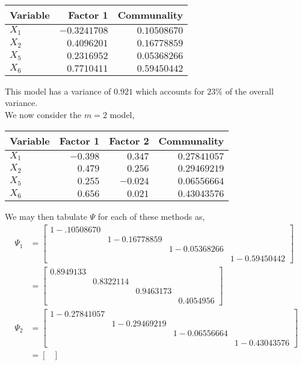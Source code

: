 \documentclass[letterpaper,10pt]{article}
\begin{document}
\begin{description}
\begin{center}
\begin{tabular}{|l|r|r|}
\hline
Variable & Factor 1 & Communality\\\hline
$X_1$ & $ -0.3241708 $ & $ 0.10508670 $\\
$X_2$ & $ 0.4096201 $ & $ 0.16778859 $\\
$X_5$ & $ 0.2316952 $ & $ 0.05368266 $\\
$X_6$ & $ 0.7710411 $ & $ 0.59450442 $\\\hline
\end{tabular}
\end{center}
This model has a variance of $0.921$ which accounts for $23\%$ of the overall variance.\\
We now consider the $m=2$ model,
\begin{center}
\begin{tabular}{|l|r|r|r|}
\hline
Variable & Factor 1 & Factor 2 & Communality\\\hline
$X_1$ & $ -0.398 $ & $ 0.347 $ & $ 0.27841057 $\\
$X_2$ & $ 0.479 $ & $ 0.256 $ & $ 0.29469219 $\\
$X_5$ & $ 0.255 $ & $ -0.024 $ & $ 0.06556664 $\\
$X_6$ & $ 0.656 $ & $0.021$ & $ 0.43043576 $\\\hline
\end{tabular}
\end{center}
We may then tabulate $\Psi$ for each of these methods as,
\begin{align*}
\Psi_1&=\begin{bmatrix}
1-.10508670\\
& 1-0.16778859\\
&& 1-0.05368266\\
&&& 1-0.59450442
\end{bmatrix}\\
&=\begin{bmatrix}
0.8949133\\
& 0.8322114\\
&& 0.9463173\\
&&& 0.4054956
\end{bmatrix}\\
\Psi_2 &= \begin{bmatrix}
1-0.27841057\\
& 1-0.29469219\\
&& 1-0.06556664\\
&&& 1-0.43043576
\end{bmatrix}\\
&=\begin{bmatrix}

\end{bmatrix}
\end{align*}
\end{description}
\end{document}
